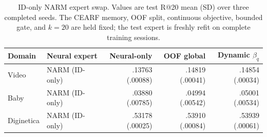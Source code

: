 \begin{table}[H]
\caption{ID-only NARM expert swap. Values are test R@20 mean (SD) over three completed seeds. The CEARF memory, OOF split, continuous objective, bounded gate, and $k=20$ are held fixed; the test expert is freshly refit on complete training sessions.}
\label{tab:narm-swap}
\centering\small
\setlength{\tabcolsep}{4pt}
\begin{tabular}{llrrr}
\toprule
Domain & Neural expert & Neural-only & OOF global & Dynamic $\beta_q$\\
\midrule
Video & NARM (ID-only) & .13763 (.00088) & .14819 (.00041) & .14854 (.00034)\\
\midrule
Baby & NARM (ID-only) & .03880 (.00785) & .04994 (.00542) & .05001 (.00534)\\
\midrule
Diginetica & NARM (ID-only) & .53178 (.00025) & .53910 (.00084) & .53939 (.00061)\\
\bottomrule
\end{tabular}
\end{table}
